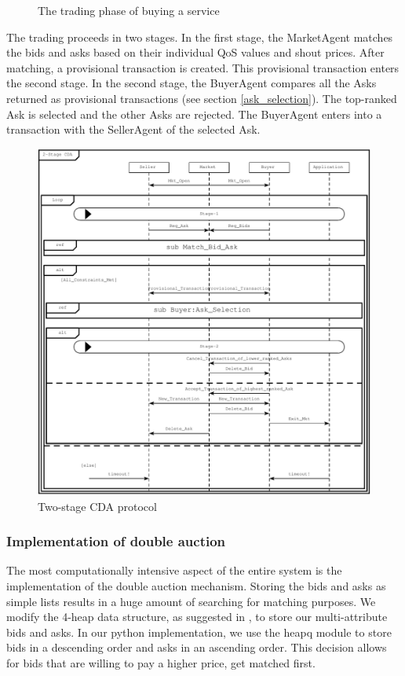 \documentclass[10pt,journal,compsoc]{IEEEtran}
\begin{document}
\begin{figure}[h]
\caption{The trading phase of buying a service \label{fig:trading_phase}}
\end{figure}


The trading proceeds in two stages. In the first stage, the MarketAgent matches the bids and asks based on their individual QoS values and shout prices. After matching, a provisional transaction is created. This provisional transaction enters the second stage. In the second stage, the BuyerAgent compares all the Asks returned as provisional transactions (see section \ref{ask_selection}). The top-ranked Ask is selected and the other Asks are rejected. The BuyerAgent enters into a transaction with the SellerAgent of the selected Ask.
\begin{figure}[h]
\centering
\includegraphics[scale=0.3]{drawings/cda_protocol.pdf}
\caption{Two-stage CDA protocol \label{fig:cda_protocol}}
\end{figure}

\subsubsection{Implementation of double auction} The most computationally intensive aspect of the entire system is the implementation of the double auction mechanism. Storing the bids and asks as simple lists results in a huge amount of searching for matching purposes. We modify the 4-heap data structure, as suggested in \cite{Wurman1998Flexible}, to store our multi-attribute bids and asks. In our python implementation, we use the heapq module to store bids in a descending order and asks in an ascending order. This decision allows for bids that are willing to pay a higher price, get matched first. 
\end{document}
